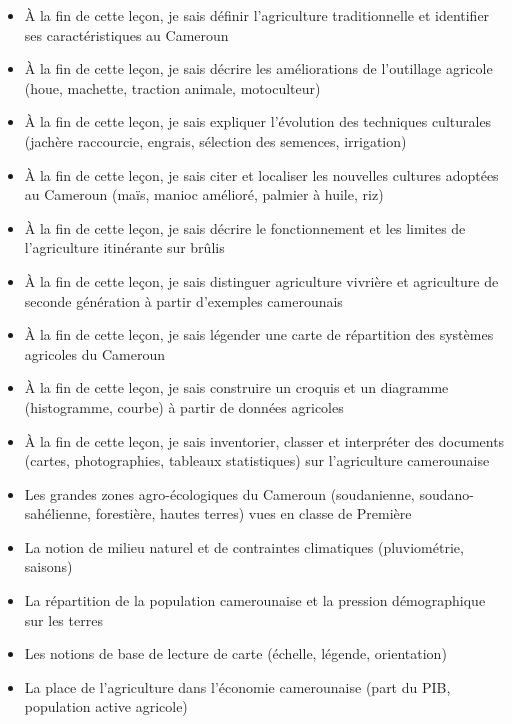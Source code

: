 \documentclass[11pt]{article}
\begin{document}
\begin{objectifs}
\begin{itemize}
\item À la fin de cette leçon, je sais définir l'agriculture traditionnelle et identifier ses caractéristiques au Cameroun
\item À la fin de cette leçon, je sais décrire les améliorations de l'outillage agricole (houe, machette, traction animale, motoculteur)
\item À la fin de cette leçon, je sais expliquer l'évolution des techniques culturales (jachère raccourcie, engrais, sélection des semences, irrigation)
\item À la fin de cette leçon, je sais citer et localiser les nouvelles cultures adoptées au Cameroun (maïs, manioc amélioré, palmier à huile, riz)
\item À la fin de cette leçon, je sais décrire le fonctionnement et les limites de l'agriculture itinérante sur brûlis
\item À la fin de cette leçon, je sais distinguer agriculture vivrière et agriculture de seconde génération à partir d'exemples camerounais
\item À la fin de cette leçon, je sais légender une carte de répartition des systèmes agricoles du Cameroun
\item À la fin de cette leçon, je sais construire un croquis et un diagramme (histogramme, courbe) à partir de données agricoles
\item À la fin de cette leçon, je sais inventorier, classer et interpréter des documents (cartes, photographies, tableaux statistiques) sur l'agriculture camerounaise
\end{itemize}
\end{objectifs}

\begin{prerequis}
\begin{itemize}
\item Les grandes zones agro-écologiques du Cameroun (soudanienne, soudano-sahélienne, forestière, hautes terres) vues en classe de Première
\item La notion de milieu naturel et de contraintes climatiques (pluviométrie, saisons)
\item La répartition de la population camerounaise et la pression démographique sur les terres
\item Les notions de base de lecture de carte (échelle, légende, orientation)
\item La place de l'agriculture dans l'économie camerounaise (part du PIB, population active agricole)
\end{itemize}
\end{prerequis}
\end{document}
